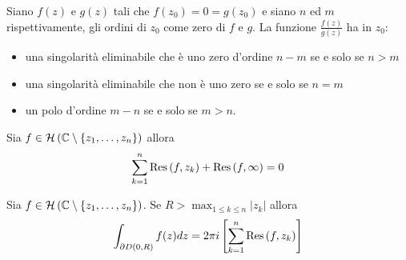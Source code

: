 \begin{thm}
Siano $f(z)$ e $g(z)$ tali che $f\left(z_{0}\right) = 0 = g\left(z_{0}\right)$ e siano $n$ ed $m$ rispettivamente, gli ordini di $z_{0}$ come zero di $f$ e $g$. La funzione $\frac{f(z)}{g(z)}$ ha in $z_{0}$:

\begin{itemize}
\item una singolarità eliminabile che è uno zero d'ordine $n - m$ se e solo se $n > m$
\item una singolarità eliminabile che non è uno zero se e solo se $n = m$
\item un polo d'ordine $m - n$ se e solo se $m > n$.
\end{itemize}
\end{thm}
\begin{thm}
Sia $f\in \mathcal{H} \left(\mathbb{C}  \setminus \left\{z_{1}, \dotsc, z_{n}\right\}\right)$ allora
\begin{equation*}
\sum\limits^{n}_{k = 1}\operatorname{Res} \left(f, z_{k}\right) + \operatorname{Res} \left(f, \infty \right) = 0
\end{equation*}
\end{thm}
\begin{thm}
Sia $f\in \mathcal{H} \left(\mathbb{C}  \setminus \left\{z_{1}, \dotsc, z_{n}\right\}\right)$. Se $R > \max_{1 \leq k \leq n}\left| z_{k}\right| $ allora
\begin{equation*}
\int\nolimits_{\partial D\left(0, R\right)} f(z) dz = 2\pi i\left[\sum\limits^{n}_{k = 1}\operatorname{Res} \left(f, z_{k}\right)\right]
\end{equation*}
\end{thm}
